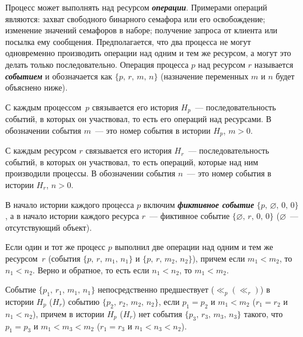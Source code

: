 \begin{multicols}{2}
Процесс может выполнять над ресурсом {\bfseries\textit{операции}}. Примерами
операций являются: за\-хват свободного бинарного семафора или его
осво\-бож\-де\-ние; изменение значений семафоров в наборе; получение запроса от
клиента или посылка ему сообщения. Предполагается, что два процесса не
могут одновременно производить операции над одним и тем же ресурсом, а
могут это делать только последовательно. Операция процесса $p$ над ресурсом
$r$ называется {\bfseries\textit{событием}} и обозначается как $\{p,\,r,\,m,\,n\}$
(назначение переменных $m$ и $n$ будет объяснено  ниже).
{

}

С каждым процессом~$p$ связывается его история $H_p$~---
последовательность событий, в которых он участвовал, то есть его операций
над ресурсами. В обозначении события $m$~--- это номер события в истории
$H_p$, $m > 0$.

С каждым ресурсом $r$ связывается его история $H_r$~---
последовательность событий, в которых он участвовал, то есть операций,
которые над ним производили процессы. В обозначении события $n$~--- это
номер события в истории $H_r$, $n > 0$.

В начало истории каждого процесса $p$ включим {\bfseries\textit{фиктивное
событие}} $\{p,\,\varnothing ,\,0,\,0\}$,
а в начало истории каждого ресурса $r$~--- фиктивное
событие $\{\varnothing ,\, r,\,0,\,0\}$ ($\varnothing$~--- отсутствующий объект).

Если один и тот же процесс $p$ выполнил две операции над одним и тем же
ресурсом~$r$ (события  $\{p,\,r,\,m_1,\,n_1\}$ и $\{p,\,r,\,m_2,\,n_2\}$), причем если
$m_1 < m_2$, то $n_1 < n_2$. Верно и обратное, то есть если $n_1 < n_2$, то $m_1 <
m_2$.

Событие $\{p_1,\,r_1,\,m_1,\,n_1\}$ непосредственно предшествует
($\ll_p (\ll_r)$) в истории $H_p$ ($H_r$) событию $\{p_2,\,r_2,\,m_2,\,n_2\}$,
если $p_1 = p_2$ и $m_1 < m_2$ ($r_1 = r_2$ и $n_1 < n_2$), причем в истории $H_p$
($H_r$) нет события $\{p_3,\,r_3,\,m_3,\,n_3\}$ такого, что $p_1 = p_3$ и $m_1 < m_3
< m_2$ ($r_1 = r_3$ и $n_1 < n_3 < n_2$).


\end{multicols}
